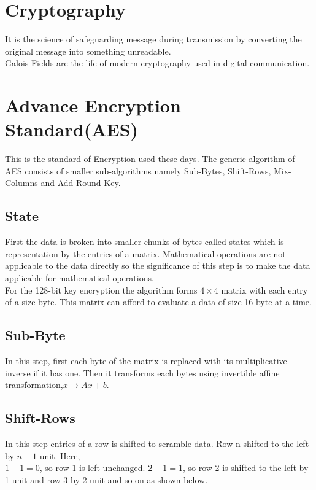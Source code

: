 \section{Cryptography}
It is the science of safeguarding message during transmission by converting the original message into something unreadable.\\
Galois Fields are the life of modern cryptography used in digital communication.

\section{Advance Encryption Standard(AES)}
This is the standard of Encryption used these days. The generic algorithm of AES consists of smaller sub-algorithms namely Sub-Bytes, Shift-Rows, Mix-Columns and Add-Round-Key.

\subsection{State}
First the data is broken into smaller chunks of bytes called states which is representation by the entries of a matrix. 
Mathematical operations are not applicable to the data directly so the significance of this step is to make the data applicable for mathematical operations.\\
For the 128-bit key encryption the algorithm forms \(4 \times 4\) matrix with each entry of a size byte. This matrix can afford to evaluate a data of size 16 byte at a time.

\subsection{Sub-Byte}
In this step, first each byte of the matrix is replaced with its multiplicative inverse if it has one. Then it transforms each bytes using invertible affine transformation,\(x \mapsto Ax+b\).

\subsection{Shift-Rows}
In this step entries of a row is shifted to scramble data. Row-n shifted to the left by \(n-1\) unit. Here,\\
\(1-1=0\), so row-1 is left unchanged. \(2-1=1\), so row-2 is shifted to the left by 1 unit and row-3 by 2 unit and so on as shown below.

